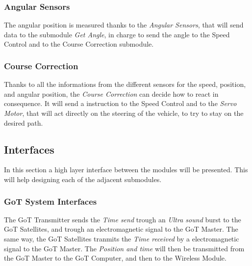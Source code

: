 \subsubsection{Angular Sensors}
The angular position is measured thanks to the \textit{Angular Sensors}, that will send data to the submodule \textit{Get Angle}, in charge to send the angle to the Speed Control and to the Course Correction submodule.

\subsubsection{Course Correction}
Thanks to all the informations from the different sensors for the speed, position, and angular position, the \textit{Course Correction} can decide how to react in consequence. It will send a instruction to the Speed Control and to the \textit{Servo Motor}, that will act directly on the steering of the vehicle, to try to stay on the desired path.



\subsection{Interfaces}
In this section a high layer interface between the modules will be presented. This will help designing each of the adjacent submodules.

\subsubsection{GoT System Interfaces}
The GoT Transmitter sends the \textit{Time send} trough an \textit{Ultra sound} burst to the GoT Satellites, and trough an electromagnetic signal to the GoT Master. The same way, the GoT Satellites tranmits the \textit{Time received} by a electromagnetic signal to the GoT Master. The \textit{Position and time} will then be transmitted from the GoT Master to the GoT Computer, and then to the Wireless Module.

